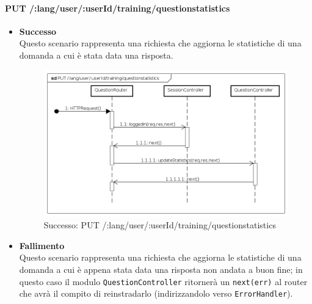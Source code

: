 







\paragraph{PUT /:lang/user/:userId/training/questionstatistics} %
\begin{itemize}
\item \textbf{Successo}\\
Questo scenario rappresenta una richiesta che aggiorna le statistiche di una domanda a cui è stata data una risposta.

\begin{figure}[ht]
	\centering
	\includegraphics[scale=0.45]{UML/DiagrammiDiSequenza/Back-end/PUT__lang_user__userId_training_questionstatistics_success.png}
	\caption{Successo: PUT /:lang/user/:userId/training/questionstatistics}
\end{figure}
\FloatBarrier

\item \textbf{Fallimento}\\
Questo scenario rappresenta una richiesta che aggiorna le statistiche di una domanda a cui è appena stata data una risposta non andata a buon fine; in questo caso il modulo \texttt{QuestionController} ritornerà un \texttt{next(err)} al router che avrà il compito di reinstradarlo (indirizzandolo verso \texttt{ErrorHandler}).


\end{itemize}
